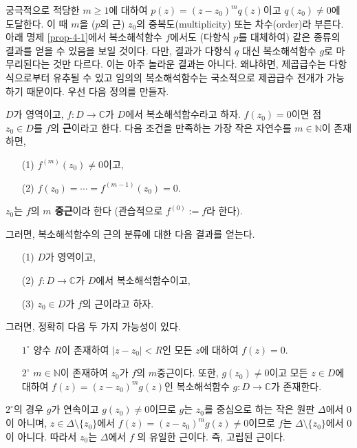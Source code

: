 궁극적으로 적당한 $m\ge1$에 대하여 $p(z) = (z-z_0)^mq(z)$이고  $q(z_0)\ne0$에 도달한다.
이 때 $m$을 ($p$의 근) $z_0$의 중복도(multiplicity) 또는 차수(order)라 부른다.
아래 명제 \ref{prop-4-1}에서 복소해석함수 $f$에서도 (다항식 $p$를 대체하여)
같은 종류의 결과를 얻을 수 있음을 보일 것이다.
다만, 결과가 다항식 $q$ 대신 복소해석함수 $g$로 마무리된다는 것만 다르다.
이는 아주 놀라운 결과는 아니다. 왜냐하면, 제곱급수는 다항식으로부터 유추될 수 있고
임의의 복소해석함수는 국소적으로 제곱급수 전개가 가능하기 때문이다.
우선 다음 정의를 만들자.

\begin{saltdefinition}{}{} \label{def-4-2}
$D$가 영역이고, $f:D\to\mathbb C$가 $D$에서 복소해석함수라고 하자.
$f(z_0)=0$이면 점 $z_0\in D$를 $f$의 {\bf 근}이라고 한다.
다음 조건을 만족하는 가장 작은 자연수를 $m\in\mathbb N$이 존재하면,
\begin{itemize}
\item[(1)] $f^{(m)}(z_0) \ne 0$이고,
\item[(2)] $f(z_0) = \cdots = f^{(m-1)}(z_0) = 0$.
\end{itemize}
$z_0$는 $f$의 {\bf $m$ 중근}이라 한다
(관습적으로 $f^{(0)} := f$라 한다).
\end{saltdefinition}

그러면, 복소해석함수의 근의 분류에 대한 다음 결과를 얻는다.

\begin{saltprop} [근의 분류]{}{} \label{prop-4-1}
\begin{itemize}
\item[(1)] $D$가 영역이고,
\item[(2)] $f:D\to\mathbb C$가 $D$에서 복소해석함수이고,
\item[(3)] $z_0 \in D$가 $f$의 근이라고 하자.
\end{itemize}
그러면, 정확히 다음 두 가지 가능성이 있다.
\begin{itemize}
\item[$1^\circ$] 양수 $R$이 존재하여 $|z-z_0|<R$인 모든 $z$에 대하여
$f(z)=0$.
\item[$2^\circ$] $m\in\mathbb N$이 존재하여
 $z_0$가 $f$의 $m$중근이다. 또한, 
 $g(z_0)\ne0$이고 모든 $z\in D$에 대하여 $f(z) = (z-z_0)^mg(z)$인
 복소해석함수 $g:D\to\mathbb C$가 존재한다.
\end{itemize}
\end{saltprop}

$2^\circ$의 경우 $g$가 연속이고 $g(z_0)\ne0$이므로
$g$는 $z_0$를 중심으로 하는 작은 원판 $\Delta$에서 $0$이 아니며,
$z\in \Delta\setminus \{z_0\}$에서 $f(z) = (z-z_0)^mg(z) \ne 0$이므로
$f$는 $\Delta\setminus \{z_0\}$에서 $0$이 아니다.
따라서 $z_0$는 $\Delta$에서 $f$ 의 유일한 근이다. 즉, 고립된 근이다.

